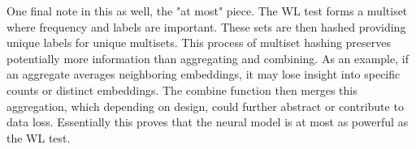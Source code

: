 \documentclass{article}
\numberwithin{figure}{section}
\begin{document}
{One final note in this as well, the "at most" piece. The WL test forms a multiset where frequency and labels are important. These sets are then hashed providing unique labels for unique multisets. This process of multiset hashing preserves potentially more information than aggregating and combining. As an example, if an aggregate averages neighboring embeddings, it may lose insight into specific counts or distinct embeddings. The combine function then merges this aggregation, which depending on design, could further abstract or contribute to data loss. Essentially this proves that the neural model is at most as powerful as the WL test.

}
\end{document}
